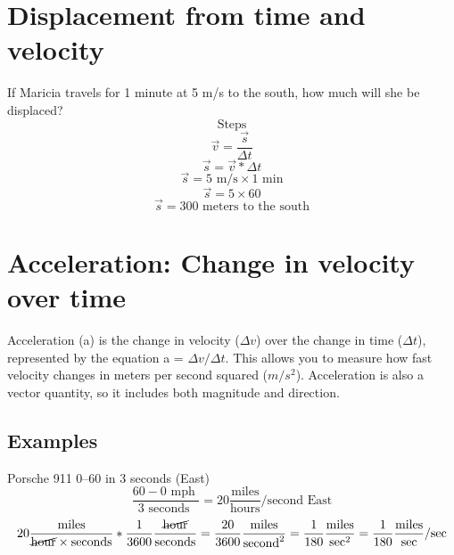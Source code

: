 \documentclass{article}
\theoremstyle{mytheoremstyle}
\theoremstyle{mytheoremstyle}
\theoremstyle{myproblemstyle}
\begin{document}
\section{Displacement from time and velocity}
If Maricia travels for 1 minute at 5 m/s to the south, how much will she be displaced?
\[
\text{Steps}
\]
\[
\overrightarrow{v} = \dfrac{\overrightarrow{s}}{\Delta{t}}
\]
\[
\overrightarrow{s} = \overrightarrow{v} * \Delta{t}
\]
\[
\overrightarrow{s} = 5\text{ m/s} \times 1\text{ min}
\]
\[
\overrightarrow{s} = 5 \times 60
\]
\[
\overrightarrow{s} = 300 \text{ meters to the south}
\]

\section{Acceleration: Change in velocity over time}
Acceleration (a) is the change in velocity ($\Delta{v}$) over the change in time ($\Delta{t}$), represented by the equation a = $\Delta{v}/\Delta{t}$. This allows you to measure how fast velocity changes in meters per second squared ($m/s^2$). Acceleration is also a vector quantity, so it includes both magnitude and direction.
\subsection{Examples}
Porsche 911 0--60 in 3 seconds (East)
\[
\dfrac{60-0\text{ mph }}{3\text{ seconds }}=20\dfrac{\text{miles}}{\text{hours}}/\text{second East}
\]
\[
20\dfrac{\text{miles}}{\cancel{\text{hour}}\times\text{seconds}}*\dfrac{1}{3600}\dfrac{\cancel{\text{hour}}}{\text{seconds}}=\dfrac{20}{3600}\dfrac{\text{miles}}{\text{second}^2}=\dfrac{1}{180}\dfrac{\text{miles}}{\text{sec}^2}=\dfrac{1}{180}\dfrac{\text{miles}}{\text{sec}}/\text{sec}
\]
\end{document}

